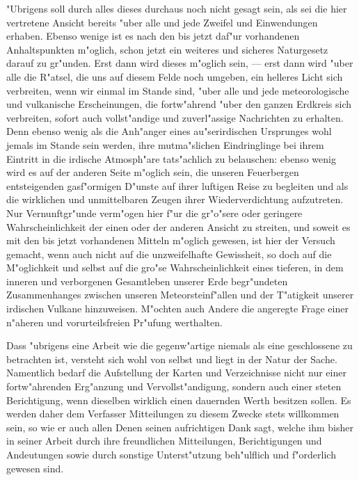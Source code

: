 \documentclass[a4paper, 8pt, oneside, polutonikogreek, german]{article}
\begin{document}
"Ubrigens soll durch alles dieses durchaus noch nicht gesagt sein, als sei die hier vertretene Ansicht bereits "uber alle und jede Zweifel und Einwendungen erhaben. Ebenso wenige ist es nach den bis jetzt daf"ur vorhandenen Anhaltspunkten m"oglich, schon jetzt ein weiteres und sicheres Naturgesetz darauf zu gr"unden. Erst dann wird dieses m"oglich sein, --- erst dann wird "uber alle die R"atsel, die uns auf diesem Felde noch umgeben, ein helleres Licht sich verbreiten, wenn wir einmal im Stande sind, "uber alle und jede meteorologische und vulkanische Erscheinungen, die fortw"ahrend "uber den ganzen Erdkreis sich verbreiten, sofort auch vollst"andige und zuverl"assige Nachrichten zu erhalten. Denn ebenso wenig als die Anh"anger eines au"serirdischen Ursprunges wohl jemals im Stande sein werden, ihre mutma"slichen Eindringlinge bei ihrem Eintritt in die irdische Atmosph"are tats"achlich zu belauschen: ebenso wenig wird es auf der anderen Seite m"oglich sein, die unseren Feuerbergen entsteigenden gasf"ormigen D"unste auf ihrer luftigen Reise zu begleiten und als die wirklichen und unmittelbaren Zeugen ihrer Wiederverdichtung aufzutreten. Nur Vernunftgr"unde verm"ogen hier f"ur die gr"o"sere oder geringere Wahrscheinlichkeit der einen oder der anderen Ansicht zu streiten, und soweit es mit den bis jetzt vorhandenen Mitteln m"oglich gewesen, ist hier der Versuch gemacht, wenn auch nicht auf die unzweifelhafte Gewissheit, so doch auf die M"oglichkeit und selbst auf die gro"se Wahrscheinlichkeit eines tieferen, in dem inneren und verborgenen Gesamtleben unserer Erde begr"undeten Zusammenhanges zwischen unseren Meteorsteinf"allen und der T"atigkeit unserer irdischen Vulkane hinzuweisen. M"ochten auch Andere die angeregte Frage einer n"aheren und vorurteilsfreien Pr"ufung werthalten.

Dass "ubrigens eine Arbeit wie die gegenw"artige niemals als eine geschlossene zu betrachten ist, versteht sich wohl von selbst und liegt in der Natur der Sache. Namentlich bedarf die Aufstellung der Karten und Verzeichnisse nicht nur einer fortw"ahrenden Erg"anzung und Vervollst"andigung, sondern auch einer steten Berichtigung, wenn dieselben wirklich einen dauernden Werth besitzen sollen. Es werden daher dem Verfasser Mitteilungen zu diesem Zwecke stets willkommen sein, so wie er auch allen Denen seinen aufrichtigen Dank sagt, welche ihm bisher in seiner Arbeit durch ihre freundlichen Mitteilungen, Berichtigungen und Andeutungen sowie durch sonstige Unterst"utzung beh"ulflich und f"orderlich gewesen sind.
\clearpage
\vspace*{\fill}
\end{document}
